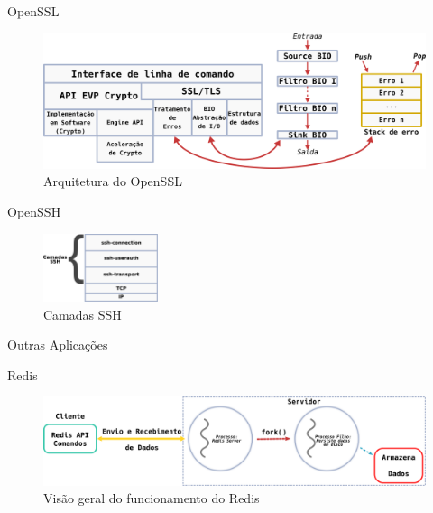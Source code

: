 \documentclass[xcolor={usenames,svgnames,dvipsnames},brazil,english,12pt,aspectratio=149]{beamer}
\begin{document}
\begin{frame}{OpenSSL}
	\begin{figure}[!h]
		\centering
		\includegraphics[width=\textwidth]{openssl_arch}
		\caption{Arquitetura do OpenSSL}
		\label{fig:openssl_arch}
	\end{figure}
\end{frame}

\begin{frame}{OpenSSH}
	\begin{figure}[!h]
		\centering
		\includegraphics[width=0.3\textwidth]{ssh_layers}
		\caption{Camadas SSH}
		\label{fig:openssh_layer}
	\end{figure}
\end{frame}

\begin{frame}{Outras Aplicações}
\end{frame}

\begin{frame}{Redis}
	\begin{figure}[!h]
		\centering
		\includegraphics[width=\textwidth]{redis_overview}
		\caption{Visão geral do funcionamento do Redis}
		\label{fig:redis}
	\end{figure}
\end{frame}
\end{document}
